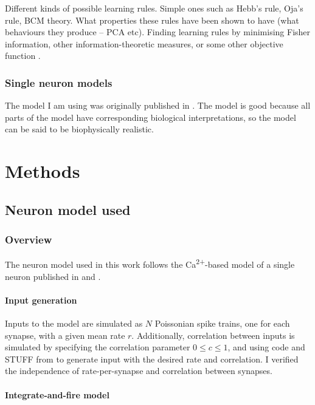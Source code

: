 \documentclass[a4paper,12pt]{report}
\theoremstyle{definition}
\begin{document}
Different kinds of possible learning rules. Simple ones such as Hebb's rule, Oja's rule, BCM theory. What properties these rules have been shown to have (what behaviours they produce -- PCA etc). Finding learning rules by minimising Fisher information, other information-theoretic measures, or some other objective function \cite{echeveste2014generating}.


\subsection{Single neuron models}


The model I am using was originally published in \cite{shouval2002unified}. The model is good because all parts of the model have corresponding biological interpretations, so the model can be said to be biophysically realistic.



\chapter{Methods}
\section{Neuron model used}
\subsection{Overview}
The neuron model used in this work follows the Ca\textsuperscript{2+}-based model of a single neuron published in \cite{shouval2002unified} and \cite{yeung2004synaptic}.

\subsubsection{Input generation}
Inputs to the model are simulated as $N$ Poissonian spike trains, one for each synapse, with a given mean rate $r$. Additionally, correlation between inputs is simulated by specifying the correlation parameter $0 \leq c \leq 1$, and using code and STUFF from \cite{macke2009} to generate input with the desired rate and correlation. I verified the independence of rate-per-synapse and correlation between synapses.

\subsubsection{Integrate-and-fire model}
\end{document}
